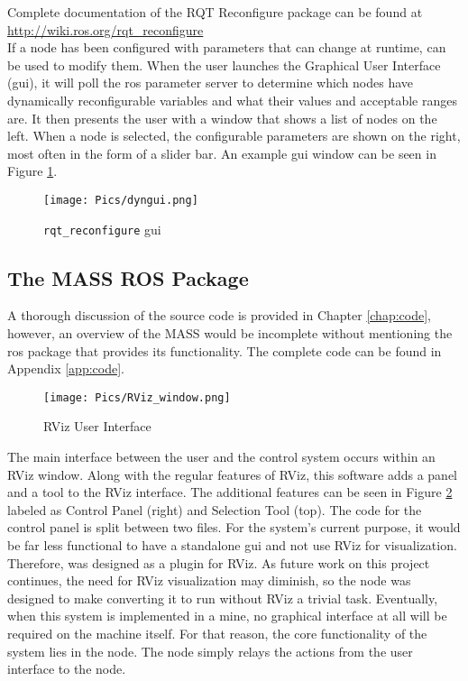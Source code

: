 Complete documentation of the RQT Reconfigure package can be found at \url{http://wiki.ros.org/rqt_reconfigure}\\

If a node has been configured with parameters that can change at runtime,  can be used to modify them. When the user launches the Graphical User Interface (\acrshort{gui}), it will poll the \acrshort{ros} parameter server to determine which nodes have dynamically reconfigurable variables and what their values and acceptable ranges are. It then presents the user with a window that shows a list of nodes on the left. When a node is selected, the configurable parameters are shown on the right, most often in the form of a slider bar. An example  \acrshort{gui} window can be seen in Figure \ref{fig:dyngui2}.

\begin{figure}[h]
    \centering
    \texttt{[image: Pics/dyngui.png]}
    \caption{\texttt{rqt\_reconfigure} \acrshort{gui}}
    \label{fig:dyngui2}
\end{figure}

\subsection{The MASS ROS Package}
\label{sub:software}

A thorough discussion of the source code is provided in Chapter \ref{chap:code}, however, an overview of the MASS would be incomplete without mentioning the \acrshort{ros} package that provides its functionality. The complete code can be found in Appendix \ref{app:code}.\\ 

\begin{figure}[H]
    \centering
    \texttt{[image: Pics/RViz\_window.png]}
    \caption{RViz User Interface}
    \label{fig:panel}
\end{figure}

The main interface between the user and the control system occurs within an RViz window. Along with the regular features of RViz, this software adds a panel and a tool to the RViz interface. The additional features can be seen in Figure \ref{fig:panel} labeled as Control Panel (right) and Selection Tool (top). The code for the control panel is split between two files. For the system's current purpose, it would be far less functional to have a standalone \acrshort{gui} and not use RViz for visualization. Therefore,  was designed as a plugin for RViz. As future work on this project continues, the need for RViz visualization may diminish, so the node was designed to make converting it to run without RViz a trivial task. Eventually, when this system is implemented in a mine, no graphical interface at all will be required on the machine itself. For that reason, the core functionality of the system lies in the  node. The  node simply relays the actions from the user interface to the  node.\\

